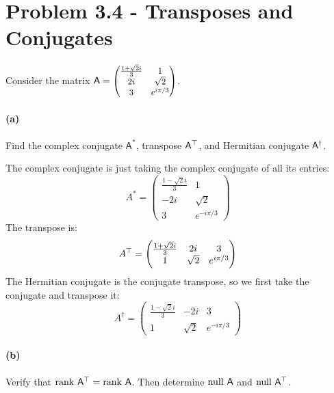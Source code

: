 \documentclass{article}
\begin{document}
\section*{Problem 3.4 - Transposes and Conjugates}

\paragraph{}
Consider the matrix $\mathsf{A} = \smmatrix{0.9}{\frac{1+\sqrt{2}i}{3} & 1 \\2i&\sqrt{2}\\ 3 & e^{i\pi/3}}$.


\paragraph{(a)}
Find the complex conjugate $\mathsf{A}^{*}$, transpose $\mathsf{A}^{\top}$, and Hermitian conjugate $\mathsf{A}^{\dagger}$.

\begin{solution}
	The complex conjugate is just taking the complex conjugate of all its entries: 
	\[
		A^* = \begin{pmatrix} \frac{1 - \sqrt{2}i}{3}&1\\-2i&\sqrt{2} \\3&e^{-i \pi / 3} \end{pmatrix} 
	\] 
	The transpose is: 
	\[
		A^\top = \begin{pmatrix} \frac{1 + \sqrt{2}i}{3} & 2i & 3\\1 & \sqrt{2} &e^{i \pi /3}  \end{pmatrix} 
	\] 
	The Hermitian conjugate is the conjugate transpose, so we first take the conjugate and transpose it: 
	\[
		A^\dagger = \begin{pmatrix} \frac{1 - \sqrt{2}i}{3} & -2i & 3\\ 1 & \sqrt{2} & e^{- i \pi /3}\end{pmatrix} 
	\] 

\end{solution}

\paragraph{(b)}
Verify that $\rank\,\mathsf{A}^{\top}=\rank\,\mathsf{A}$.  Then determine $\operatorname{null}\,\mathsf{A}$ and $\operatorname{null}\,\mathsf{A}^{\top}$.  
\end{document}
